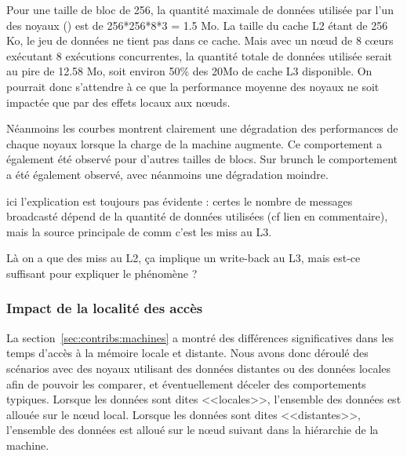 Pour une taille de bloc de 256, la quantité maximale de données utilisée par l'un des noyaux (\gemm) est de 256*256*8*3 = 1.5 Mo. La taille du cache L2 étant de 256 Ko, le jeu de données ne tient pas dans ce cache. Mais avec un nœud de 8 cœurs exécutant 8 exécutions concurrentes, la quantité totale de données utilisée serait au pire de 12.58 Mo, soit environ 50\% des 20Mo de cache L3 disponible.
On pourrait donc s'attendre à ce que la performance moyenne des noyaux ne soit impactée que par des effets locaux aux nœuds.

Néanmoins les courbes montrent clairement une dégradation des performances de chaque noyaux lorsque la charge de la machine augmente.
Ce comportement a également été observé pour d'autres tailles de blocs. Sur brunch le comportement a été également observé, avec néanmoins une dégradation moindre.

\begin{todo}
  ici l'explication est toujours pas évidente : certes le nombre de messages broadcasté dépend de la quantité de données utilisées (cf lien en commentaire), mais la source principale de comm c'est les miss au L3.
  
  Là on a que des miss au L2, ça implique un write-back au L3, mais est-ce suffisant pour expliquer le phénomène ?
\end{todo}

\subsubsection{Impact de la localité des accès}\label{sec:contribs:apps:cholesky:locality}

La section~\ref{sec:contribs:machines} a montré des différences significatives dans les temps d'accès à la mémoire locale et distante.
Nous avons donc déroulé des scénarios avec des noyaux utilisant des données distantes ou des données locales afin de pouvoir les comparer, et éventuellement déceler des comportements typiques.
Lorsque les données sont dites <<locales>>, l'ensemble des données est allouée sur le nœud local. Lorsque les données sont dites <<distantes>>, l'ensemble des données est alloué sur le nœud suivant dans la hiérarchie de la machine.

